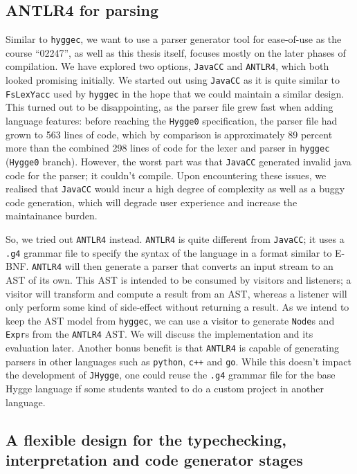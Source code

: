 \subsection{ANTLR4 for parsing}

Similar to \texttt{hyggec}, we want to use a parser generator tool for ease-of-use as the course ``02247'', as well as this
thesis itself, focuses mostly on the later phases of compilation. We have explored two options, \texttt{JavaCC} and \texttt{ANTLR4},
which both looked promising initially. We started out using \texttt{JavaCC} as it is quite similar to \texttt{FsLexYacc} used by
\texttt{hyggec} in the hope that we could maintain a similar design. This turned out to be disappointing, as the parser file
grew fast when adding language features: before reaching the \texttt{Hygge0} specification, the parser file had grown to 563
lines of code, which by comparison is approximately 89 percent more than the combined 298 lines of code for the lexer and
parser in \texttt{hyggec} (\texttt{Hygge0} branch). However, the worst part was that \texttt{JavaCC} generated invalid java
code for the parser; it couldn't compile. Upon encountering these issues, we realised that \texttt{JavaCC} would incur a
high degree of complexity as well as a buggy code generation, which will degrade user experience and increase the maintainance
burden.

So, we tried out \texttt{ANTLR4} instead. \texttt{ANTLR4} is quite different from \texttt{JavaCC}; it uses a \texttt{.g4} grammar
file to specify the syntax of the language in a format similar to E-BNF. \texttt{ANTLR4} will then generate a parser that converts
an input stream to an AST of its own. This AST is intended to be consumed by visitors and listeners; a visitor will transform and
compute a result from an AST, whereas a listener will only perform some kind of side-effect without returning a result. As we
intend to keep the AST model from \texttt{hyggec}, we can use a visitor to generate \texttt{Node}s and \texttt{Expr}s from the
\texttt{ANTLR4} AST. We will discuss the implementation and its evaluation later. Another bonus benefit is that \texttt{ANTLR4}
is capable of generating parsers in other languages such as \texttt{python}, \texttt{c++} and \texttt{go}. While this doesn't
impact the development of \texttt{JHygge}, one could reuse the \texttt{.g4} grammar file for the base Hygge language if some
students wanted to do a custom project in another language.

\subsection{A flexible design for the typechecking, interpretation and code generator stages}

